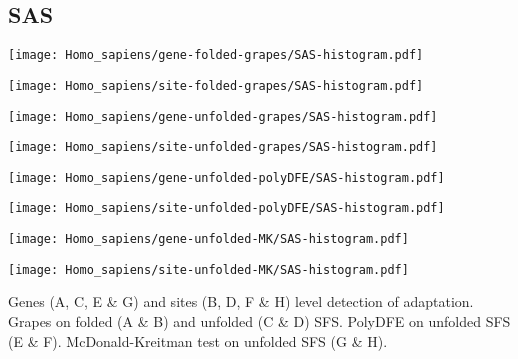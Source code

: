 \documentclass{article}
\begin{document}
\pagebreak
\subsection{SAS}
\centering
\begin{minipage}{0.49\linewidth}
    \texttt{[image: Homo\_sapiens/gene-folded-grapes/SAS-histogram.pdf]}
\end{minipage}%
\hfill
\begin{minipage}{0.49\linewidth}
    \texttt{[image: Homo\_sapiens/site-folded-grapes/SAS-histogram.pdf]}
\end{minipage}
\hfill
\begin{minipage}{0.49\linewidth}
    \texttt{[image: Homo\_sapiens/gene-unfolded-grapes/SAS-histogram.pdf]}
\end{minipage}%
\hfill
\begin{minipage}{0.49\linewidth}
    \texttt{[image: Homo\_sapiens/site-unfolded-grapes/SAS-histogram.pdf]}
\end{minipage}
\hfill
\begin{minipage}{0.49\linewidth}
    \texttt{[image: Homo\_sapiens/gene-unfolded-polyDFE/SAS-histogram.pdf]}
\end{minipage}%
\hfill
\begin{minipage}{0.49\linewidth}
    \texttt{[image: Homo\_sapiens/site-unfolded-polyDFE/SAS-histogram.pdf]}
\end{minipage}
\hfill
\begin{minipage}{0.49\linewidth}
    \texttt{[image: Homo\_sapiens/gene-unfolded-MK/SAS-histogram.pdf]}
\end{minipage}%
\hfill
\begin{minipage}{0.49\linewidth}
    \texttt{[image: Homo\_sapiens/site-unfolded-MK/SAS-histogram.pdf]}
\end{minipage}
\hfill
\flushleft
Genes (A, C, E \& G) and sites (B, D, F \& H) level detection of adaptation.
Grapes on folded (A \& B) and unfolded (C \& D) SFS.
PolyDFE on unfolded SFS (E \& F).
McDonald-Kreitman test on unfolded SFS (G \& H).
\end{document}
